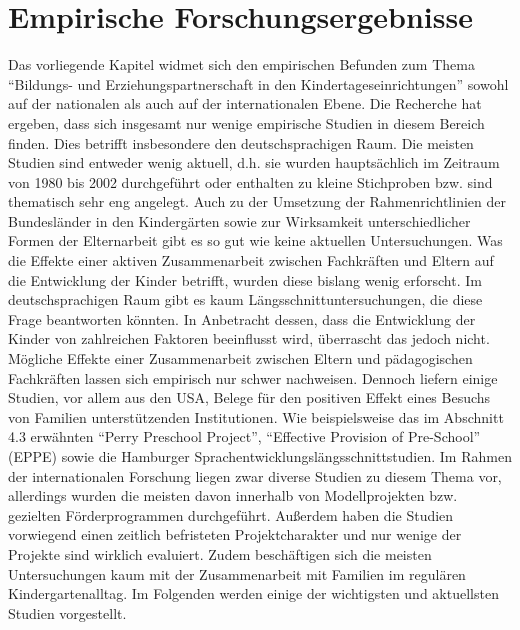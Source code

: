 \documentclass[12pt,a4paper]{article}
\begin{document}
\section{Empirische Forschungsergebnisse}  
Das vorliegende Kapitel widmet sich den empirischen Befunden zum Thema "`Bildungs- und Erziehungspartnerschaft in den Kindertageseinrichtungen"' sowohl auf der nationalen als auch auf der internationalen Ebene. Die Recherche hat ergeben, dass sich insgesamt nur wenige empirische Studien in diesem Bereich finden. Dies betrifft insbesondere den deutschsprachigen Raum. Die meisten Studien sind entweder wenig aktuell, d.h. sie wurden hauptsächlich im Zeitraum von 1980 bis 2002 durchgeführt oder enthalten zu kleine Stichproben bzw. sind thematisch sehr eng angelegt. Auch zu der Umsetzung der Rahmenrichtlinien der Bundesländer in den Kindergärten sowie zur Wirksamkeit unterschiedlicher Formen der Elternarbeit gibt es so gut wie keine aktuellen Untersuchungen. 
	Was die Effekte einer aktiven Zusammenarbeit zwischen Fachkräften und Eltern auf die Entwicklung der Kinder betrifft, wurden diese bislang wenig erforscht. Im deutschsprachigen Raum gibt es kaum Längsschnittuntersuchungen, die diese Frage beantworten könnten. In Anbetracht dessen, dass die Entwicklung der Kinder von zahlreichen Faktoren beeinflusst wird, überrascht das jedoch nicht. Mögliche Effekte einer Zusammenarbeit zwischen Eltern und pädagogischen Fachkräften lassen sich empirisch nur schwer nachweisen. Dennoch liefern einige Studien, vor allem aus den USA, Belege für den positiven Effekt eines Besuchs von Familien unterstützenden Institutionen. Wie beispielsweise das im Abschnitt 4.3 erwähnten "`Perry Preschool Project"', "`Effective Provision of Pre-School"' (EPPE) sowie die Hamburger Sprachentwicklungslängsschnittstudien.
Im Rahmen der internationalen Forschung liegen zwar diverse Studien zu diesem Thema vor, allerdings wurden die meisten davon innerhalb von Modellprojekten bzw. gezielten Förderprogrammen durchgeführt. Außerdem haben die Studien vorwiegend einen zeitlich befristeten Projektcharakter und nur wenige der Projekte sind wirklich evaluiert. Zudem beschäftigen sich die meisten Untersuchungen kaum mit der Zusammenarbeit mit Familien im regulären Kindergartenalltag.
Im Folgenden werden einige der wichtigsten und aktuellsten Studien vorgestellt.
\end{document}

